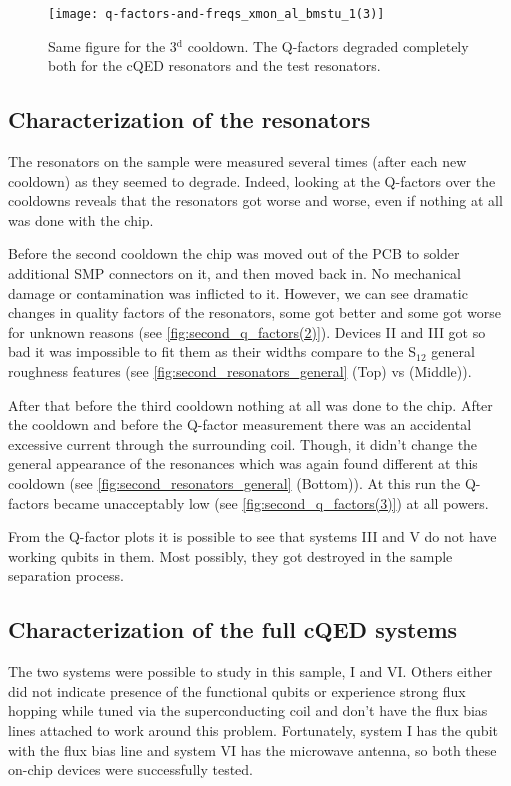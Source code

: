 \documentclass[12pt, twoside]{report}
\numberwithin{equation}{section}
\begin{document}
\begin{figure}[h!]
\centering
\texttt{[image: q-factors-and-freqs\_xmon\_al\_bmstu\_1(3)]}
\caption{Same figure for the 3$^\text{d}$ cooldown. The Q-factors degraded completely both for the cQED resonators and the test resonators.}
\label{fig:second_q_factors(3)}
\end{figure}

\subsection{Characterization of the resonators}

The resonators on the sample were measured several times (after each new cooldown) as they seemed to degrade. Indeed, looking at the Q-factors over the cooldowns reveals that the resonators got worse and worse, even if nothing at all was done with the chip.

Before the second cooldown the chip was moved out of the PCB to solder additional SMP connectors on it, and then moved back in. No mechanical damage or contamination was inflicted to it. However, we can see dramatic changes in quality factors of the resonators, some got better and some got worse for unknown reasons (see \autoref{fig:second_q_factors(2)}). Devices II and III got so bad it was impossible to fit them as their widths compare to the S$_{12}$ general roughness features (see \autoref{fig:second_resonators_general} (Top) vs (Middle)).

After that before the third cooldown nothing at all was done to the chip. After the cooldown and before the Q-factor measurement there was an accidental excessive current through the surrounding coil. Though, it didn't change the general appearance of the resonances which was again found different at this cooldown (see \autoref{fig:second_resonators_general} (Bottom)). At this run the Q-factors became unacceptably low (see \autoref{fig:second_q_factors(3)}) at all powers. 

From the Q-factor plots it is possible to see that systems III and V do not have working qubits in them. Most possibly, they got destroyed in the sample separation process.


\subsection{Characterization of the full cQED systems}

The two systems were possible to study in this sample, I and VI. Others either did not indicate presence of the functional qubits or experience strong flux hopping while tuned via the superconducting coil and don't have the flux bias lines attached to work around this problem. Fortunately, system I has the qubit with the flux bias line and system VI has the microwave antenna, so both these on-chip devices were successfully tested.
\end{document}
